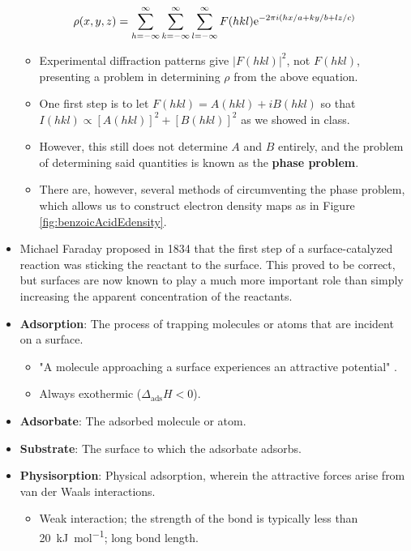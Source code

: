 \documentclass[../notes.tex]{subfiles}
\begin{document}
\begin{itemize}
    \begin{equation*}
        \rho(x,y,z) = \sum_{h=-\infty}^\infty\sum_{k=-\infty}^\infty\sum_{l=-\infty}^\infty F(hkl)\e[-2\pi i(hx/a+ky/b+lz/c)]
    \end{equation*}
    \begin{itemize}
        \item Experimental diffraction patterns give $|F(hkl)|^2$, not $F(hkl)$, presenting a problem in determining $\rho$ from the above equation.
        \item One first step is to let $F(hkl)=A(hkl)+iB(hkl)$ so that $I(hkl)\propto[A(hkl)]^2+[B(hkl)]^2$ as we showed in class.
        \item However, this still does not determine $A$ and $B$ entirely, and the problem of determining said quantities is known as the \textbf{phase problem}.
        \item There are, however, several methods of circumventing the phase problem, which allows us to construct electron density maps as in Figure \ref{fig:benzoicAcidEdensity}.
    \end{itemize}
    \item Michael Faraday proposed in 1834 that the first step of a surface-catalyzed reaction was sticking the reactant to the surface. This proved to be correct, but surfaces are now known to play a much more important role than simply increasing the apparent concentration of the reactants.
    \item \textbf{Adsorption}: The process of trapping molecules or atoms that are incident on a surface.
    \begin{itemize}
        \item "A molecule approaching a surface experiences an attractive potential" \parencite[1295]{bib:McQuarrieSimon}.
        \item Always exothermic ($\Delta_\text{ads}H<0$).
    \end{itemize}
    \item \textbf{Adsorbate}: The adsorbed molecule or atom.
    \item \textbf{Substrate}: The surface to which the adsorbate adsorbs.
    \item \textbf{Physisorption}: Physical adsorption, wherein the attractive forces arise from van der Waals interactions.
    \begin{itemize}
        \item Weak interaction; the strength of the bond is typically less than \SI{20}{\kilo\joule\per\mole}; long bond length.

\end{itemize}
\end{itemize}
\end{document}
